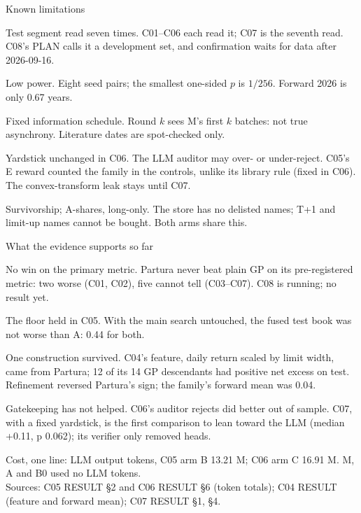 \documentclass[t,20pt]{beamer}
\newcommand\notesize{\fontsize{14}{17}\selectfont\hyphenpenalty=10000\exhyphenpenalty=10000}
\newcommand\key[1]{{\mediumfont\color{accent}#1}}
\newcommand\lead[1]{{\mediumfont #1}}
\newenvironment{blist}{%
  \begin{list}{\textcolor{sec}{\textbullet}}{\def\makelabel##1{##1\hfil}%
    \setlength\leftmargin{0.34in}\setlength\labelwidth{0.2in}\setlength\labelsep{0.14in}%
    \setlength\itemsep{16pt}\setlength\parsep{0pt}\setlength\topsep{0pt}\setlength\partopsep{0pt}%
    \setlength\itemindent{0pt}\setlength\listparindent{0pt}\setlength\rightmargin{0pt}}}%
  {\end{list}}
\newcounter{nl}
\newenvironment{nlist}{%
  \begin{list}{\textcolor{sec}{\arabic{nl}}}{\usecounter{nl}\def\makelabel##1{##1\hfil}%
    \setlength\leftmargin{0.40in}\setlength\labelwidth{0.26in}\setlength\labelsep{0.14in}%
    \setlength\itemsep{26pt}\setlength\parsep{0pt}\setlength\topsep{0pt}\setlength\partopsep{0pt}%
    \setlength\itemindent{0pt}\setlength\listparindent{0pt}\setlength\rightmargin{0pt}}}%
  {\end{list}}
\newcommand\gap[1]{\par\vspace{#1}}
\newcommand\textfirst{\vspace*{-0.14in}}
\begin{document}
\begin{frame}{Known limitations}
\textfirst
\begin{blist}
  \item \lead{Test segment read seven times.} C01–C06 each read it; C07 is the seventh read. C08's PLAN calls it a development set, and confirmation waits for data after 2026-09-16.
  \item \lead{Low power.} Eight seed pairs; the smallest one-sided $p$ is $1/256$. Forward 2026 is only 0.67 years.
  \item \lead{Fixed information schedule.} Round $k$ sees M's first $k$ batches: not true asynchrony. Literature dates are spot-checked only.
  \item \lead{Yardstick unchanged in C06.} The LLM auditor may over- or under-reject. C05's E reward counted the family in the controls, unlike its library rule (fixed in C06). The convex-transform leak stays until C07.
  \item \lead{Survivorship; A-shares, long-only.} The store has no delisted names; T+1 and limit-up names cannot be bought. Both arms share this.
\end{blist}
\end{frame}

\begin{frame}{What the evidence supports so far}
\textfirst
\begin{nlist}\setlength\itemsep{18pt}
  \item \lead{No win on the primary metric.} Partura never beat plain GP on its pre-registered metric: two \key{worse} (C01, C02), five \key{cannot tell} (C03–C07). \key{C08} is running; no result yet.
  \item \lead{The floor held in C05.} With the main search untouched, the fused test book was not worse than A: 0.44 for both.
  \item \lead{One construction survived.} C04's feature, daily return scaled by limit width, came from Partura; 12 of its 14 GP descendants had positive net excess on test. Refinement reversed Partura's sign; the family's forward mean was 0.04.
  \item \lead{Gatekeeping has not helped.} C06's auditor rejects did better out of sample. C07, with a fixed yardstick, is the \key{first} comparison to lean toward the LLM (median +0.11, p 0.062); its verifier only removed heads.
\end{nlist}
\gap{0.14in}
{\notesize\color{sec}Cost, one line: LLM output tokens, C05 arm B 13.21 M; C06 arm C 16.91 M. M, A and B0 used no LLM tokens.\\
Sources: C05 RESULT §2 and C06 RESULT §6 (token totals); C04 RESULT (feature and forward mean); C07 RESULT §1, §4.\par}
\end{frame}
\end{document}
